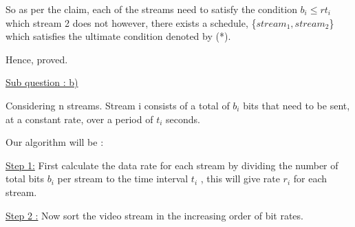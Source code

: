 \documentclass[letterpaper,portrait,12pt]{article}
\begin{document}
\begin{flushleft}
So as per the claim, each of the streams need to satisfy the condition $b_i \le rt_i$ which stream 2 does not however, there exists a schedule, \{${stream}_1, {stream}_2$\} which satisfies the ultimate condition denoted by (*).
\end{flushleft}


\begin{flushleft}
Hence, proved.
\end{flushleft}


\begin{flushleft}

\end{flushleft}


\begin{flushleft}
\uline{Sub question : b)}
\end{flushleft}


\begin{flushleft}

\end{flushleft}


\begin{flushleft}
Considering n streams. Stream i consists of a total of $b_i$ bits that need to be sent, at a constant rate, over a period of $t_i$ seconds.
\end{flushleft}


\begin{flushleft}

\end{flushleft}


\begin{flushleft}
Our algorithm will be :
\end{flushleft}


\begin{flushleft}
\uline{Step 1:} First calculate the data rate for each stream by dividing the number of total bits $b_i$ per stream to the time interval $t_i$ , this will give rate $r_i$ for each stream.
\end{flushleft}


\begin{flushleft}

\end{flushleft}


\begin{flushleft}
\uline{Step 2 :} Now sort the video stream in the increasing order of bit rates. 
\end{flushleft}


\begin{flushleft}

\end{flushleft}
\end{document}
